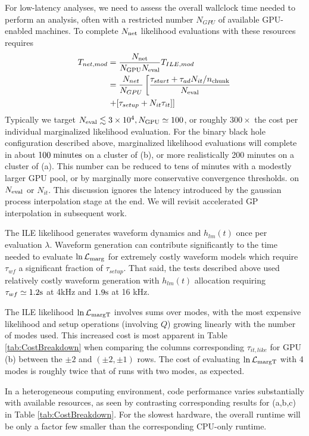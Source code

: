 \documentclass[twocolumn,prd,nofootinbib]{revtex4}
\newcommand\unit[1]{{\rm #1}}
\newcommand\ILE{ILE}
\begin{document}
For low-latency analyses, we need to assess the overall wallclock time needed to perform an analysis, often with a
restricted number $N_{GPU}$ of available GPU-enabled machines.   To  complete $N_{\rm net}$ likelihood evaluations
with these resources requires
\begin{align}
T_{net,mod} &= \frac{N_{\rm net}}{N_{\rm GPU} N_{\rm eval}} T_{ILE,mod} \nonumber \\
& =
  \frac{N_{net}}{N_{GPU}}\left[
\frac{\tau_{start} + \tau_{ad}N_{it}/n_{\rm chunk}}{N_{\rm eval}} 
 \right. \nonumber \\
& \left. + 
 [ \tau_{setup}  + N_{it}\tau_{it}
 ] 
 \right]
\end{align}
Typically we target $N_{\rm eval}  \lesssim 3\times 10^4, N_{\rm GPU} \simeq 100$, or roughly $300\times$ the cost per
individual marginalized likelihood evaluation.  For the binary black hole configuration described above, marginalized
likelihood evaluations will complete in about $100\; \unit{minutes}$ on a cluster of (b), or more realistically 200
minutes on a cluster of (a).  This number can be reduced to
tens of minutes with a modestly larger GPU pool, or by  marginally more conservative convergence thresholds. on $N_{\rm
  eval}$ or $N_{it}$.  
This discussion ignores the latency introduced by the  gaussian process interpolation stage at the end.  We will revisit
accelerated GP interpolation in subsequent work.


The \ILE{} likelihood  generates waveform dynamics and $h_{lm}(t)$ once per evaluation $\lambda$.   Waveform generation can contribute significantly to the
time needed to evaluate  $\ln {\cal L}_{\rm marg}$ for extremely costly
waveform models which require $\tau_{wf} $ a significant fraction of $  \tau_{setup}$.   That said, the tests described
above used relatively costly waveform generation with $h_{lm}(t)$ allocation requiring $\tau_{wf} \simeq 1.2 \unit{s}$
at 4kHz and $1.9\unit{s}$ at 16 kHz.

The \ILE{} likelihood $\ln {\cal L}_{\rm margT}$ involves sums over modes, with the most expensive likelihood and setup operations (involving $Q$) growing linearly with
the number of modes used.  This increased cost is most apparent in Table \ref{tab:CostBreakdown} when comparing the
columns corresponding  $\tau_{it,like}$ for GPU (b) between the $\pm 2$ and $(\pm 2,\pm 1)$ rows.  The cost of
evaluating $\ln {\cal L}_{\rm margT}$   with 4 modes is roughly twice that of runs with two modes, as expected. 

In a heterogeneous computing environment, code performance varies substantially with available resources, as seen by
contrasting corresponding results for (a,b,c) in Table \ref{tab:CostBreakdown}.      For
the slowest hardware,  the overall runtime will be only a factor few smaller than the corresponding CPU-only runtime.
\end{document}
